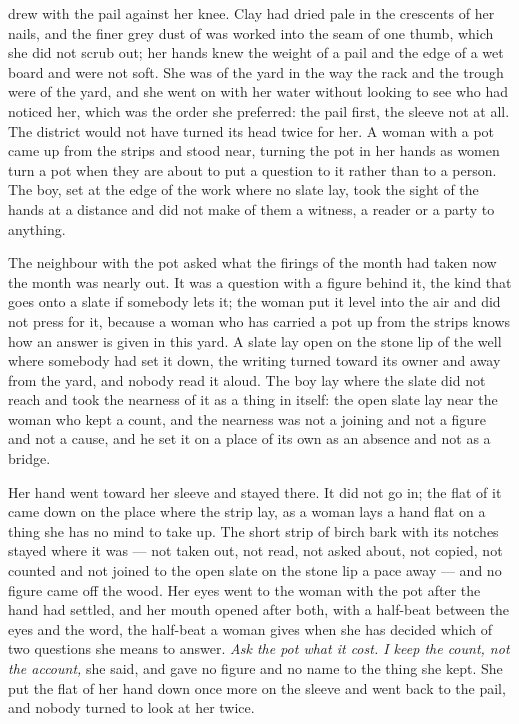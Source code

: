  drew with the pail against her knee. Clay had dried pale in the crescents of her nails, and the finer grey dust of  was worked into the seam of one thumb, which she did not scrub out; her hands knew the weight of a pail and the edge of a wet board and were not soft. She was of the yard in the way the rack and the trough were of the yard, and she went on with her water without looking to see who had noticed her, which was the order she preferred: the pail first, the sleeve not at all. The district would not have turned its head twice for her. A woman with a pot came up from the strips and stood near, turning the pot in her hands as women turn a pot when they are about to put a question to it rather than to a person. The boy, set at the edge of the work where no slate lay, took the sight of the hands at a distance and did not make of them a witness, a reader or a party to anything.

The neighbour with the pot asked what the firings of the month had taken now the month was nearly out. It was a question with a figure behind it, the kind that goes onto a slate if somebody lets it; the woman put it level into the air and did not press for it, because a woman who has carried a pot up from the strips knows how an answer is given in this yard. A slate lay open on the stone lip of the well where somebody had set it down, the writing turned toward its owner and away from the yard, and nobody read it aloud. The boy lay where the slate did not reach and took the nearness of it as a thing in itself: the open slate lay near the woman who kept a count, and the nearness was not a joining and not a figure and not a cause, and he set it on a place of its own as an absence and not as a bridge.

\scenebreak

Her hand went toward her sleeve and stayed there. It did not go in; the flat of it came down on the place where the strip lay, as a woman lays a hand flat on a thing she has no mind to take up. The short strip of birch bark with its notches stayed where it was --- not taken out, not read, not asked about, not copied, not counted and not joined to the open slate on the stone lip a pace away --- and no figure came off the wood. Her eyes went to the woman with the pot after the hand had settled, and her mouth opened after both, with a half-beat between the eyes and the word, the half-beat a woman gives when she has decided which of two questions she means to answer. \emph{Ask the pot what it cost. I keep the count, not the account,} she said, and gave no figure and no name to the thing she kept. She put the flat of her hand down once more on the sleeve and went back to the pail, and nobody turned to look at her twice.

